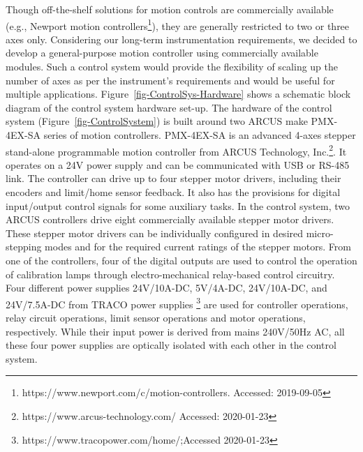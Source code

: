 Though off-the-shelf solutions for motion controls are commercially available (e.g., Newport motion controllers\footnote{https://www.newport.com/c/motion-controllers. Accessed: 2019-09-05}), they are generally restricted to two or three axes only. Considering our long-term instrumentation requirements, we decided to develop a general-purpose motion controller using commercially available modules. Such a control system would provide the flexibility of scaling up the number of axes as per the instrument's requirements and would be useful for multiple applications. Figure~\ref{fig-ControlSys-Hardware} shows a schematic block diagram of the control system hardware set-up. The hardware of the control system (Figure~\ref{fig-ControlSystem}) is built around two ARCUS make PMX-4EX-SA series of motion controllers. PMX-4EX-SA is an advanced 4-axes stepper stand-alone programmable motion controller from ARCUS Technology, Inc.\footnote{https://www.arcus-technology.com/ Accessed: 2020-01-23}. It operates on a 24V power supply and can be communicated with USB or RS-485 link. The controller can drive up to four stepper motor drivers, including their encoders and limit/home sensor feedback. It also has the provisions for digital input/output control signals for some auxiliary tasks. In the control system, two ARCUS controllers drive eight commercially available stepper motor drivers. These stepper motor drivers can be individually configured in desired micro-stepping modes and for the required current ratings of the stepper motors. From one of the controllers, four of the digital outputs are used to control the operation of calibration lamps through electro-mechanical relay-based control circuitry. Four different power supplies 24V/10A-DC, 5V/4A-DC, 24V/10A-DC, and 24V/7.5A-DC from TRACO power supplies \footnote{https://www.tracopower.com/home/;Accessed 2020-01-23} are used for controller operations, relay circuit operations, limit sensor operations and motor operations, respectively. While their input power is derived from mains 240V/50Hz AC, all these four power supplies are optically isolated with each other in the control system.  
\par
